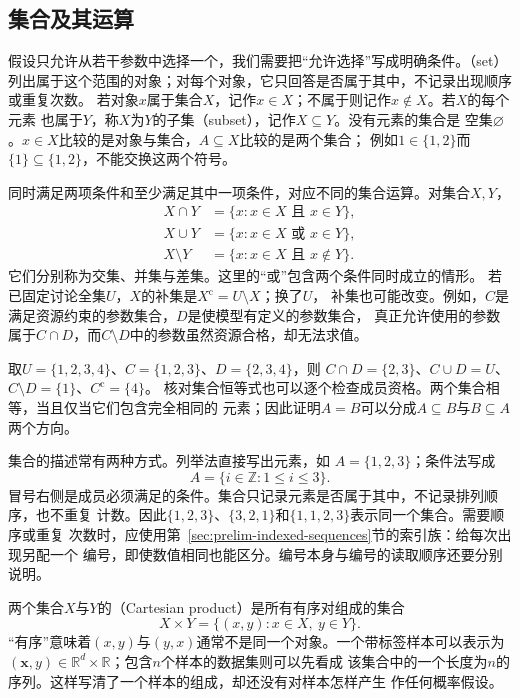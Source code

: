 \subsection{集合及其运算}
\label{sec:prelim-set-operations}

假设只允许从若干参数中选择一个，我们需要把“允许选择”写成明确条件。（set）列出属于这个范围的对象；对每个对象，它只回答是否属于其中，不记录出现顺序或重复次数。
若对象$x$属于集合$X$，记作$x\in X$；不属于则记作$x\notin X$。若$X$的每个元素
也属于$Y$，称$X$为$Y$的子集（subset），记作$X\subseteq Y$。没有元素的集合是
空集$\varnothing$。$x\in X$比较的是对象与集合，$A\subseteq X$比较的是两个集合；
例如$1\in\{1,2\}$而$\{1\}\subseteq\{1,2\}$，不能交换这两个符号。

同时满足两项条件和至少满足其中一项条件，对应不同的集合运算。对集合$X,Y$，
\[
  \begin{aligned}
    X\cap Y&=\{x:x\in X\text{ 且 }x\in Y\},\\
    X\cup Y&=\{x:x\in X\text{ 或 }x\in Y\},\\
    X\setminus Y&=\{x:x\in X\text{ 且 }x\notin Y\}.
  \end{aligned}
\]
它们分别称为交集、并集与差集。这里的“或”包含两个条件同时成立的情形。
若已固定讨论全集$U$，$X$的补集是$X^{\mathrm c}=U\setminus X$；换了$U$，
补集也可能改变。例如，$C$是满足资源约束的参数集合，$D$是使模型有定义的参数集合，
真正允许使用的参数属于$C\cap D$，而$C\setminus D$中的参数虽然资源合格，却无法求值。

取$U=\{1,2,3,4\}$、$C=\{1,2,3\}$、$D=\{2,3,4\}$，则
$C\cap D=\{2,3\}$、$C\cup D=U$、$C\setminus D=\{1\}$、$C^{\mathrm c}=\{4\}$。
核对集合恒等式也可以逐个检查成员资格。两个集合相等，当且仅当它们包含完全相同的
元素；因此证明$A=B$可以分成$A\subseteq B$与$B\subseteq A$两个方向。

集合的描述常有两种方式。列举法直接写出元素，如
$A=\{1,2,3\}$；条件法写成
\[
  A=\{i\in\mathbb{Z}:1\leq i\leq 3\}.
\]
冒号右侧是成员必须满足的条件。集合只记录元素是否属于其中，不记录排列顺序，也不重复
计数。因此$\{1,2,3\}$、$\{3,2,1\}$和$\{1,1,2,3\}$表示同一个集合。需要顺序或重复
次数时，应使用第~\ref{sec:prelim-indexed-sequences}节的索引族：给每次出现另配一个
编号，即使数值相同也能区分。编号本身与编号的读取顺序还要分别说明。

两个集合$X$与$Y$的（Cartesian product）是所有有序对组成的集合
\[
  X\times Y=\{(x,y):x\in X,\ y\in Y\}.
\]
“有序”意味着$(x,y)$与$(y,x)$通常不是同一个对象。一个带标签样本可以表示为
$(\bm{x},y)\in\mathbb{R}^d\times\mathbb{R}$；包含$n$个样本的数据集则可以先看成
该集合中的一个长度为$n$的序列。这样写清了一个样本的组成，却还没有对样本怎样产生
作任何概率假设。

